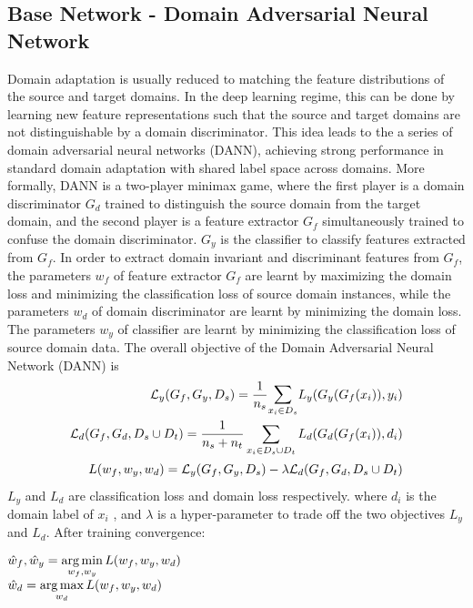 \subsection{Base Network - Domain Adversarial Neural Network}
Domain adaptation is usually reduced to matching the feature distributions of the source and target domains. In the deep learning regime, this can be done by
learning new feature representations such that the source and target domains
are not distinguishable by a domain discriminator. This idea leads to the a series
of domain adversarial neural networks (DANN)\cite{uda,dann,deeptransfer}, achieving strong performance
in standard domain adaptation with shared label space across domains.
More formally, DANN is a two-player minimax game, where the first player is
a domain discriminator $G_d$ trained to distinguish the source domain from the
target domain, and the second player is a feature extractor $G_f$ simultaneously
trained to confuse the domain discriminator. $G_y$ is the classifier to classify features extracted from $G_f$.
In order to extract domain invariant and discriminant features from $G_f$, the parameters $w_f$ of feature extractor $G_f$ are learnt by maximizing the domain loss and minimizing the classification loss of source domain instances, while the parameters $w_d$ of domain discriminator are learnt by minimizing the domain loss. The parameters $w_y$ of classifier are learnt by minimizing the classification loss of source domain data.
The overall objective of the Domain Adversarial Neural Network (DANN) is
\begin{equation}
\begin{align*}
    \mathcal{L}_y(G_f, G_y, D_s)  = \dfrac{1}{n_{s}} \mathlarger\sum\limits_{x_i \in D_s} L_y(G_y(G_f(x_i)),y_i)\\
     \mathcal{L}_d(G_f, G_d, D_s \cup D_t) = \dfrac{1}{n_s + n_t} \sum\limits_{x_i \in {D_s \cup D_t}} L_d(G_d(G_f(x_i)),d_i)\\
     L(w_f, w_y, w_d) = \mathcal{L}_y(G_f, G_y, D_s) - \lambda \mathcal{L}_d(G_f, G_d, D_s \cup D_t)
\end{align*}
\end{equation}
$L_y$ and $L_d$ are classification loss and domain loss respectively. where $d_i$ is the domain label of $x_i$ , and $\lambda$ is a hyper-parameter to trade off the
two objectives $L_y$ and $L_d$. After training convergence:
\begin{center}
    $\hat{w}_f, \hat{w}_y  = \operatorname*{arg\,min} \limits_{w_f, w_y} L(w_f, w_y, w_d)$\\
    $\hat{w}_d  = \operatorname*{arg\,max} \limits_{w_d} L(w_f, w_y, w_d)$
\end{center}

